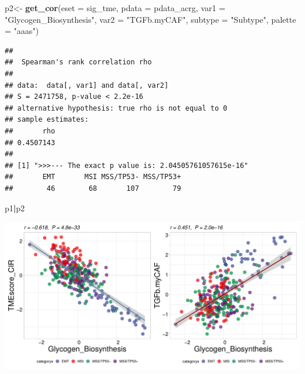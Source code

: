 \documentclass[
  12pt,
]{book}
\newenvironment{Shaded}{\begin{snugshade}}{\end{snugshade}}
\newcommand{\AttributeTok}[1]{\textcolor[rgb]{0.13,0.29,0.53}{#1}}
\newcommand{\FunctionTok}[1]{\textcolor[rgb]{0.13,0.29,0.53}{\textbf{#1}}}
\newcommand{\NormalTok}[1]{#1}
\newcommand{\OtherTok}[1]{\textcolor[rgb]{0.56,0.35,0.01}{#1}}
\newcommand{\SpecialCharTok}[1]{\textcolor[rgb]{0.81,0.36,0.00}{\textbf{#1}}}
\newcommand{\StringTok}[1]{\textcolor[rgb]{0.31,0.60,0.02}{#1}}
\theoremstyle{definition}
\theoremstyle{definition}
\theoremstyle{definition}
\theoremstyle{definition}
\theoremstyle{remark}
\begin{document}
\begin{Shaded}
\begin{Highlighting}[]
\NormalTok{p2}\OtherTok{\textless{}{-}} \FunctionTok{get\_cor}\NormalTok{(}\AttributeTok{eset =}\NormalTok{ sig\_tme, }\AttributeTok{pdata =}\NormalTok{ pdata\_acrg, }\AttributeTok{var1 =} \StringTok{"Glycogen\_Biosynthesis"}\NormalTok{, }\AttributeTok{var2 =} \StringTok{"TGFb.myCAF"}\NormalTok{, }\AttributeTok{subtype =} \StringTok{"Subtype"}\NormalTok{, }\AttributeTok{palette =} \StringTok{"aaas"}\NormalTok{)}
\end{Highlighting}
\end{Shaded}

\begin{verbatim}
## 
##  Spearman's rank correlation rho
## 
## data:  data[, var1] and data[, var2]
## S = 2471758, p-value < 2.2e-16
## alternative hypothesis: true rho is not equal to 0
## sample estimates:
##       rho 
## 0.4507143 
## 
## [1] ">>>--- The exact p value is: 2.04505761057615e-16"
##       EMT       MSI MSS/TP53- MSS/TP53+ 
##        46        68       107        79
\end{verbatim}

\begin{Shaded}
\begin{Highlighting}[]
\NormalTok{p1}\SpecialCharTok{|}\NormalTok{p2}
\end{Highlighting}
\end{Shaded}

\includegraphics{_main_files/figure-latex/unnamed-chunk-53-1.pdf}
\end{document}
